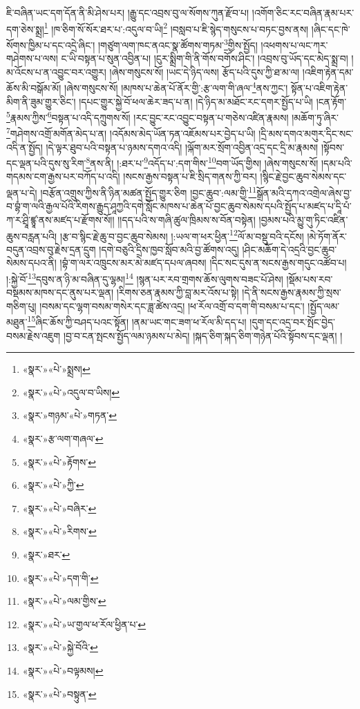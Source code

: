 ཇི་བཞིན་ཡང་དག་དོན་ནི་མི་ཤེས་པར། །རྒྱུ་དང་འབྲས་བུ་ལ་སོགས་ཀུན་རྫོབ་པ། །འགོག་ཅིང་རང་བཞིན་རྣམ་པར་དག་ཅེས་སྨྲ།\footnote{«སྣར་»«པེ་»སྨྲས།} །ཁ་ཅིག་སོ་སོར་ཐར་པ་:འདུལ་བ་ཡི།\footnote{«སྣར་»«པེ་»འདུལ་བ་ཡིས།} །བསླབ་པ་ཇི་སྙེད་གསུངས་པ་བཏང་བྱས་ནས། །ཞིང་དང་ཁེ་སོགས་ཁྱིམ་པ་དང་འདྲེ་ཞིང་། །གཙུག་ལག་ཁང་ནའང་སྣ་ཚོགས་གཏམ་\footnote{«སྣར་»གཉམ་«པེ་»གཏན་}གྱིས་སྤྱོད། །འཕགས་པ་ལང་ཀར་གཤེགས་པ་ལས། ང་ཡི་བསྟན་པ་སུན་འབྱིན་པ། །ངུར་སྨྲིག་གི་ནི་གོས་བགོས་ཤིང་། །འབྲས་བུ་ཡོད་དང་མེད་སྨྲ་བ། །མ་འོངས་པ་ན་འབྱུང་བར་འགྱུར། །ཞེས་གསུངས་སོ། །ཡང་དེ་ཉིད་ལས། རྩོད་པའི་དུས་ཀྱི་ཐ་མ་ལ། །འཇིག་རྟེན་དམ་ཆོས་མི་བསྒོམ་མོ། །ཞེས་གསུངས་སོ། །མཁས་པ་ཆེན་པོ་ནོར་གྱི་:རྩ་ལག་གི་ཞལ་\footnote{«སྣར་»རྩ་ལག་གཞལ་}ནས་ཀྱང་། སྟོན་པ་འཇིག་རྟེན་མིག་ནི་ཟུམ་གྱུར་ཅིང་། །དཔང་གྱུར་སྐྱེ་བོ་ཕལ་ཆེར་ཟད་པ་ན། །དེ་ཉིད་མ་མཐོང་རང་དགར་སྤྱོད་པ་ཡི། །ངན་རྟོག་\footnote{«སྣར་»«པེ་»རྟོགས་}རྣམས་ཀྱིས་\footnote{«སྣར་»«པེ་»ཀྱི་}བསྟན་པ་འདི་དཀྲུགས་སོ། །རང་བྱུང་རང་འབྱུང་བསྟན་པ་གཅེས་འཛིན་རྣམས། །མཆོག་ཏུ་ཞིར་\footnote{«སྣར་»«པེ་»བཞིར་}གཤེགས་འགྲོ་མགོན་མེད་པ་ན། །འདོམས་མེད་ཡོན་ཏན་འཇོམས་པར་བྱེད་པ་ཡི། །དྲི་མས་དགའ་མགུར་དིང་སང་འདི་ན་སྤྱོད། །དེ་ལྟར་ཐུབ་པའི་བསྟན་པ་ཉམས་དགའ་འདི། །ལྐོག་མར་སྲོག་འབྱིན་འདྲ་དང་དྲི་མ་རྣམས། །སྟོབས་དང་ལྡན་པའི་དུས་སུ་རིག་\footnote{«སྣར་»«པེ་»རིགས་}ནས་ནི། །:ཐར་པ་\footnote{«སྣར་»ཐར་}འདོད་པ་:དག་གིས་\footnote{«སྣར་»«པེ་»དག་གི་}བག་ཡོད་གྱིས། །ཞེས་གསུངས་སོ། །དམ་པའི་གདམས་ངག་རྒྱས་པར་བཀོད་པ་འདི། །སངས་རྒྱས་བསྟན་པ་ཇི་སྲིད་གནས་ཀྱི་བར། །སྙིང་རྗེ་བྱང་ཆུབ་སེམས་དང་ལྡན་པ་དེ། །བརྩོན་འགྲུས་ཀྱིས་ནི་ཉིན་མཚན་སྤྱོད་གྱུར་ཅིག །བྱང་ཆུབ་:ལམ་གྱི་\footnote{«སྣར་»«པེ་»ལམ་གྱིས་}སྒྲོན་མའི་དཀའ་འགྲེལ་ཞེས་བྱ་བ་བྷཾ་ག་ལའི་རྒྱལ་པོའི་རིགས་རྒྱུད་ཤཱཀྱའི་དགེ་སློང་མཁས་པ་ཆེན་པོ་བྱང་ཆུབ་སེམས་དཔའི་སྤྱོད་པ་མཛད་པ་དཱི་པཾ་ཀ་ར་ཤྲཱི་ཛྙཱ་ནས་མཛད་པ་རྫོགས་སོ།། །།དད་པའི་ས་གཞི་ཚུལ་ཁྲིམས་ས་བོན་བསྟེན། །བྱམས་པའི་མྱུ་གུ་ཏིང་འཛིན་ཆུས་བརླན་པའི། །རྩ་བ་སྙིང་རྗེ་ཆུ་བ་བྱང་ཆུབ་སེམས། །:ཡལ་ག་ཕར་ཕྱིན་\footnote{«སྣར་»«པེ་»ཡ་གྱལ་ཕ་རོལ་ཕྱིན་པ་}ལོ་མ་བསྡུ་བའི་དངོས། །མེ་ཏོག་ནོར་བདུན་འབྲས་བུ་རྗེས་དྲན་དྲུག །དགེ་བཅུའི་དྲིས་ཁྱབ་སློབ་མའི་བྱ་ཚོགས་འདུ། །ཤིང་མཆོག་དེ་འདྲའི་བྱང་ཆུབ་སེམས་དཔའ་ནི། །བྷཾ་ག་ལར་འཁྲུངས་མར་མེ་མཛད་དཔལ་ཞབས། །དིང་སང་དུས་ན་སངས་རྒྱས་གདུང་འཚོབ་པ། །:སྐྱེ་བོ་\footnote{«སྣར་»«པེ་»སྐྱེ་བོའི་}དབུས་ན་ཉི་མ་བཞིན་དུ་ལྷམ།\footnote{«སྣར་»«པེ་»བལྟམས།} །སྙན་པར་རབ་གྲགས་ཆོས་ལུགས་བཟང་པོ་ཤེས། །སྡོམ་པས་རབ་བསྡམས་མཁས་དང་ནུས་པར་ལྡན། །རིགས་ཅན་རྣམས་ཀྱི་བླ་མར་འོས་པ་སྟེ། །དེ་ནི་སངས་རྒྱས་རྣམས་ཀྱི་སྲས་གཅིག་པུ། །བསམ་དང་ལྷག་བསམ་གསེར་དང་ཟླ་ཚེས་འདྲ། །ཕ་རོལ་འགྲོ་བ་དག་གི་བསམ་པ་དང་། །སྤྱོད་ལམ་མཐུན་\footnote{«སྣར་»«པེ་»བསྟུན་}ཞིང་ཆོས་ཀྱི་བཤད་པའང་སྟོན། །ནམ་ཡང་གང་ཟག་ཕ་རོལ་མི་དད་པ། །དུག་དང་འདྲ་བར་སྤོང་བྱེད་བསམ་རྗེས་འཇུག །བྱ་བ་ངན་སྤངས་སྤྱོད་ལམ་ཉམས་པ་མེད། །སྐད་ཅིག་སྐད་ཅིག་གཉེན་པོའི་སྟོབས་དང་ལྡན། །
